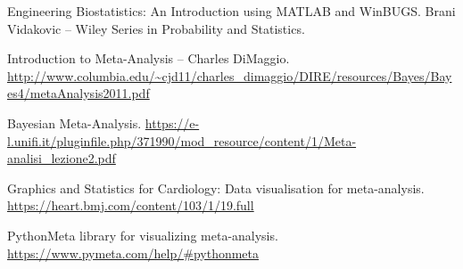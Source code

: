 \documentclass[a4 paper]{article}
\begin{document}

\begin{thebibliography}{9}


\label{stat} 
Engineering Biostatistics: An Introduction using MATLAB and WinBUGS. 
Brani Vidakovic -- Wiley Series in Probability and Statistics.


\label{col} 
Introduction to Meta-Analysis --
Charles DiMaggio. \url{http://www.columbia.edu/~cjd11/charles_dimaggio/DIRE/resources/Bayes/Bayes4/metaAnalysis2011.pdf}


\label{bma} 
Bayesian Meta-Analysis. \url{https://e-l.unifi.it/pluginfile.php/371990/mod_resource/content/1/Meta-analisi_lezione2.pdf}

\label{card} 
Graphics and Statistics for Cardiology: Data visualisation for meta-analysis. \url{https://heart.bmj.com/content/103/1/19.full}

\label{pymeta} 
PythonMeta library for visualizing meta-analysis. \url{https://www.pymeta.com/help/#pythonmeta}




\end{thebibliography}
\end{document}
